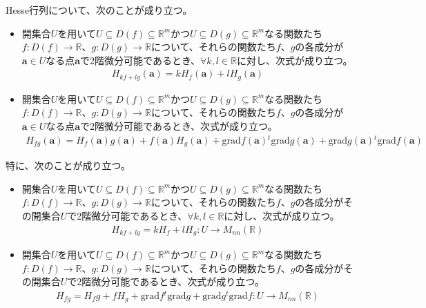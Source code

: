 \documentclass[dvipdfmx]{jsarticle}
\begin{document}
\begin{thm}\label{4.2.7.8} Hesse行列について、次のことが成り立つ。
\begin{itemize}
\item
  開集合$U$を用いて$U \subseteq D(f) \subseteq \mathbb{R}^{m}$かつ$U \subseteq D(g) \subseteq \mathbb{R}^{m}$なる関数たち$f:D(f) \rightarrow \mathbb{R}$、$g:D(g) \rightarrow \mathbb{R}$について、それらの関数たち$f$、$g$の各成分が$\mathbf{a} \in U$なる点$\mathbf{a}$で2階微分可能であるとき、$\forall k,l \in \mathbb{R}$に対し、次式が成り立つ。
\begin{align*}
H_{kf + lg}\left( \mathbf{a} \right) = kH_{f}\left( \mathbf{a} \right) + lH_{g}\left( \mathbf{a} \right)
\end{align*}
\item
  開集合$U$を用いて$U \subseteq D(f) \subseteq \mathbb{R}^{m}$かつ$U \subseteq D(g) \subseteq \mathbb{R}^{m}$なる関数たち$f:D(f) \rightarrow \mathbb{R}$、$g:D(g) \rightarrow \mathbb{R}$について、それらの関数たち$f$、$g$の各成分が$\mathbf{a} \in U$なる点$\mathbf{a}$で2階微分可能であるとき、次式が成り立つ。
\begin{align*}
H_{fg}\left( \mathbf{a} \right) = H_{f}\left( \mathbf{a} \right)g\left( \mathbf{a} \right) + f\left( \mathbf{a} \right)H_{g}\left( \mathbf{a} \right) + \mathrm{grad}f\left( \mathbf{a} \right){}^{t}\mathrm{grad}g\left( \mathbf{a} \right) + \mathrm{grad}g\left( \mathbf{a} \right){}^{t}\mathrm{grad}f\left( \mathbf{a} \right)
\end{align*}
\end{itemize}\par
特に、次のことが成り立つ。
\begin{itemize}
\item
  開集合$U$を用いて$U \subseteq D(f) \subseteq \mathbb{R}^{m}$かつ$U \subseteq D(g) \subseteq \mathbb{R}^{m}$なる関数たち$f:D(f) \rightarrow \mathbb{R}$、$g:D(g) \rightarrow \mathbb{R}$について、それらの関数たち$f$、$g$の各成分がその開集合$U$で2階微分可能であるとき、$\forall k,l \in \mathbb{R}$に対し、次式が成り立つ。
\begin{align*}
H_{kf + lg} = kH_{f} + lH_{g}:U \rightarrow M_{nn}\left( \mathbb{R} \right)
\end{align*}
\item
  開集合$U$を用いて$U \subseteq D(f) \subseteq \mathbb{R}^{m}$かつ$U \subseteq D(g) \subseteq \mathbb{R}^{m}$なる関数たち$f:D(f) \rightarrow \mathbb{R}$、$g:D(g) \rightarrow \mathbb{R}$について、それらの関数たち$f$、$g$の各成分がその開集合$U$で2階微分可能であるとき、次式が成り立つ。
\begin{align*}
H_{fg} = H_{f}g + fH_{g} + \mathrm{grad}f{}^{t}\mathrm{grad}g + \mathrm{grad}g{}^{t}\mathrm{grad}f:U \rightarrow M_{nn}\left( \mathbb{R} \right)
\end{align*}
\end{itemize}
\end{thm}
\end{document}
